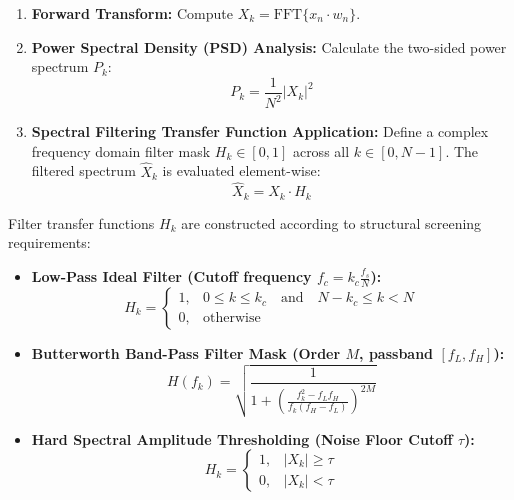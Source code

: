 \documentclass[11pt,a4paper]{article}
\begin{document}
\begin{enumerate}
    \item \textbf{Forward Transform:} Compute $X_k = \text{FFT}\{x_n \cdot w_n\}$.
    \item \textbf{Power Spectral Density (PSD) Analysis:} Calculate the two-sided power spectrum $P_k$:
    \begin{equation}
    P_k = \frac{1}{N^2} |X_k|^2
    \end{equation}
    \item \textbf{Spectral Filtering Transfer Function Application:} Define a complex frequency domain filter mask $H_k \in [0, 1]$ across all $k \in [0, N-1]$. The filtered spectrum $\hat{X}_k$ is evaluated element-wise:
    \begin{equation}
    \hat{X}_k = X_k \cdot H_k
    \end{equation}
\end{enumerate}

Filter transfer functions $H_k$ are constructed according to structural screening requirements:

\begin{itemize}
    \item \textbf{Low-Pass Ideal Filter (Cutoff frequency $f_c = k_c \frac{f_s}{N}$):}
    \begin{equation}
    H_k = \begin{cases} 
    1, & 0 \le k \le k_c \quad \text{and} \quad N - k_c \le k < N \\
    0, & \text{otherwise}
    \end{cases}
    \end{equation}
    
    \item \textbf{Butterworth Band-Pass Filter Mask (Order $M$, passband $[f_{L}, f_{H}]$):}
    \begin{equation}
    H(f_k) = \sqrt{\frac{1}{1 + \left( \frac{f_k^2 - f_L f_H}{f_k (f_H - f_L)} \right)^{2M}}}
    \end{equation}
    
    \item \textbf{Hard Spectral Amplitude Thresholding (Noise Floor Cutoff $\tau$):}
    \begin{equation}
    H_k = \begin{cases}
    1, & |X_k| \ge \tau \\
    0, & |X_k| < \tau
    \end{cases}
    \end{equation}
\end{itemize}
\end{document}
